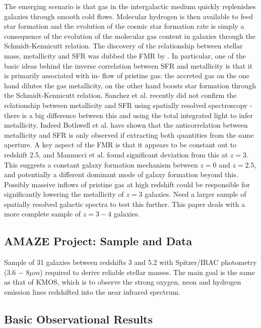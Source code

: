 \documentclass{literature}
\begin{document}
The emerging scenario is that gas in the intergalactic medium quickly replenishes galaxies through smooth cold flows. Molecular hydrogen is then available to feed star formation and the evolution of the cosmic star formation rate is simply a consequence of the evolution of the molecular gas content in galaxies through the Schmidt-Kennicutt relation. The discovery of the relationship between stellar mass, metallicity and SFR was dubbed the FMR by \citep{Mannucci_2010}. In particular, one of the basic ideas behind the inverse correlation between SFR and metallicity is that it is primarily associated with in- flow of pristine gas: the accreted gas on the one hand dilutes the gas metallicity, on the other hand boosts star formation through the Schmidt-Kennicutt relation. Sanchez et al. \citep{Sanchez_2013} recently did not confirm the relationship between metallicity and SFR using spatially resolved spectroscopy - there is a big difference between this and using the total integrated light to infer metallicity. Indeed Bothwell et al. \citep{Bothwell_2013} have shown that the anticorrelation between metallicity and SFR is only observed if extracting both quantities from the same aperture. A key aspect of the FMR is that it appears to be constant out to redshift 2.5, and Mannucci et al. \citep{Mannucci_2010} found significant deviation from this at $z=3$. This suggests a constant galaxy formation mechanism between $z = 0$ and $z = 2.5$, and potentially a different dominant mode of galaxy formation beyond this. Possibly massive inflows of pristine gas at high redshift could be responsible for significantly lowering the metallicity of $z=3$ galaxies. Need a larger sample of spatially resolved galactic spectra to test this further. This paper deals with a more complete sample of $z = 3-4$ galaxies. \\ 
\subsection{AMAZE Project: Sample and Data}
Sample of 31 galaxies between redshifts 3 and 5.2 with Spitzer/IRAC photometry (3.6 − 8$\mu m$) required to derive reliable stellar masses. The main goal is the same as that of KMOS, which is to observe the strong oxygen, neon and hydrogen emission lines redshifted into the near infrared spectrum. 
\subsection{Basic Observational Results}
\end{document}
